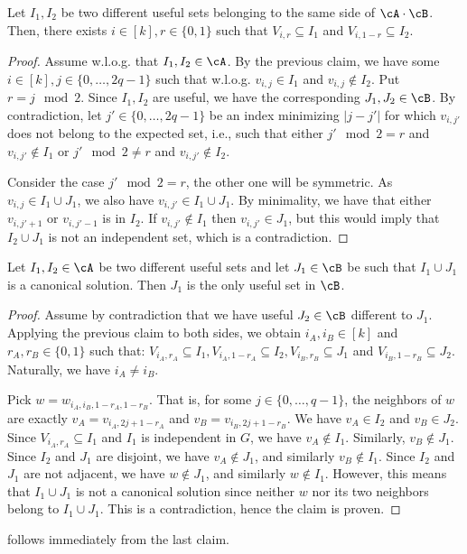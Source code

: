 \begin{claim}
    Let $I_1, I_2$ be two different useful sets belonging to the same side of $\cA \cdot \cB$. Then, there exists $i \in [k], r \in \{0,1\}$ such that $V_{i,r} \subseteq I_1$ and $V_{i, 1-r} \subseteq I_2$.
\end{claim}
\begin{proof}
    Assume w.l.o.g. that $I_1, I_2 \in \cA$.
    By the previous claim, we have some $i \in [k], j \in \{0, \dots, 2q - 1\}$ such that w.l.o.g. $v_{i,j} \in I_1$ and $v_{i,j} \not\in I_2$. Put $r = j \mod 2$. Since $I_1, I_2$ are useful, we have the corresponding $J_1, J_2 \in \cB$. By contradiction, let $j' \in \{0, \dots, 2q - 1\}$ be an index minimizing $|j - j'|$ for which $v_{i,j'}$ does not belong to the expected set, i.e., such that either $j' \mod 2 = r$ and $v_{i,j'} \not\in I_1$ or $j' \mod 2 \neq r$ and $v_{i,j'} \not\in I_2$.

    Consider the case $j' \mod 2 = r$, the other one will be symmetric. As $v_{i,j} \in I_1 \cup J_1$, we also have $v_{i,j'} \in I_1 \cup J_1$. By minimality, we have that either $v_{i,j'+1}$ or $v_{i,j'-1}$ is in $I_2$. If $v_{i,j'} \not\in I_1$ then $v_{i,j'} \in J_1$, but this would imply that $I_2 \cup J_1$ is not an independent set, which is a contradiction.
\end{proof}

\begin{claim}
    Let $I_1, I_2 \in \cA$ be two different useful sets and let $J_1 \in \cB$ be such that $I_1 \cup J_1$ is a canonical solution. Then $J_1$ is the only useful set in $\cB$.
\end{claim}
\begin{proof}
    Assume by contradiction that we have useful $J_2 \in \cB$ different to $J_1$. Applying the previous claim to both sides, we obtain $i_A, i_B \in [k]$ and $r_A, r_B \in \{0,1\}$ such that: $V_{i_A,r_A} \subseteq I_1, V_{i_A, 1 - r_A} \subseteq I_2, V_{i_B, r_B} \subseteq J_1$ and $V_{i_B, 1 - r_B} \subseteq J_2$. Naturally, we have $i_A \neq i_B$.

    Pick $w = w_{i_A, i_B, 1 - r_A, 1 - r_B}$. That is,  for some $j \in \{0, \dots, q-1\}$, the neighbors of $w$ are exactly $v_A = v_{i_A, 2j + 1 - r_A}$ and $ v_B = v_{i_B, 2j + 1 - r_B}$. We have $v_A \in I_2$ and $v_B \in J_2$. Since $V_{i_A, r_A} \subseteq I_1$ and $I_1$ is independent in $G$, we have $v_A \not\in I_1$. Similarly, $v_B \not\in J_1$. Since $I_2$ and $J_1$ are disjoint, we have $v_A \not\in J_1$, and similarly $v_B \not\in I_1$. Since $I_2$ and $J_1$ are not adjacent, we have $w \not\in J_1$, and similarly $w \not\in I_1$. However, this means that $I_1 \cup J_1$ is not a canonical solution since neither $w$ nor its two neighbors belong to $I_1 \cup J_1$. This is a contradiction, hence the claim is proven.
\end{proof}
 follows immediately from the last claim.




